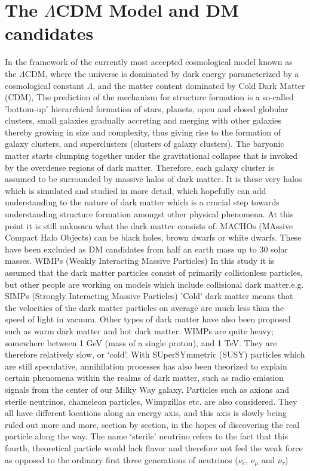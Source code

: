 \section{The $\Lambda$CDM Model and DM candidates}
In the framework of the currently most accepted cosmological model known as the $\Lambda$CDM, where the universe is dominated by dark energy parameterized by a cosmological constant $\Lambda$, and the matter content dominated by Cold Dark Matter (CDM), The prediction of the mechanism for structure formation is a so-called 'bottom-up' hierarchical formation of stars, planets, open and closed globular clusters, small galaxies gradually accreting and merging with other galaxies thereby growing in size and complexity, thus giving rise to the formation of galaxy clusters, and superclusters (clusters of galaxy clusters). The baryonic matter starts clumping together under the gravitational collapse that is invoked by the overdense regions of dark matter. Therefore, each galaxy cluster is assumed to be surrounded by massive halos of dark matter. It is these very halos which is simulated and studied in more detail, which hopefully can add understanding to the nature of dark matter which is a crucial step towards understanding structure formation amongst other physical phenomena. At this point it is still unknown what the dark matter consists of. MACHOs (MAssive Compact Halo Objects) can be black holes, brown dwarfs or white dwarfs. These have been excluded as DM candidates from half an earth mass up to 30 solar masses. WIMPs (Weakly Interacting Massive Particles) In this study it is assumed that the dark matter particles consist of primarily collisionless particles, but other people are working on models which include collisional dark matter,e.g. SIMPs (Strongly Interacting Massive Particles) 'Cold' dark matter means that the velocities of the dark matter particles on average are much less than the speed of light in vacuum. 
Other types of dark matter have also been proposed such as warm dark matter and hot dark matter. WIMPs are quite heavy; somewhere between 1 GeV (mass of a single proton), and 1 TeV. They are therefore relatively slow, or ‘cold’. With SUperSYmmetric (SUSY) particles which are still speculative, annihilation processes has also been theorized to explain certain phenomena within the realms of dark matter, such as radio emission signals from the center of our Milky Way galaxy. Particles such as axions and sterile neutrinos, chameleon particles, Wimpzillas etc. are also considered. They all have different locations along an energy axis, and this axis is slowly being ruled out more and more, section by section, in the hopes of discovering the real particle along the way. The name ‘sterile’ neutrino refers to the fact that this fourth, theoretical particle would lack flavor and therefore not feel the weak force as opposed to the ordinary first three generations of neutrinos ($\nu_e$, $\nu_{\mu}$ and $\nu_{\tau}$)